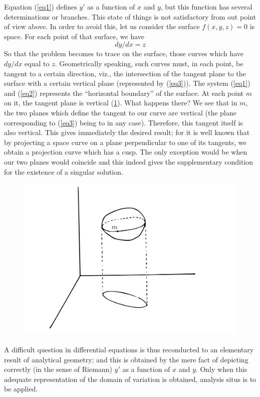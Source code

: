 \documentclass[12pt,oneside]{book}
\begin{document}
Equation (\ref{eq1}) defines $y'$ as a function of $x$ and $y$, but this
function has several determinations or branches. This state of things is not
satisfactory from out point of view above. In order to avoid this, let us
consider the surface $f(x,y,z)=0$ is space. For each point of that surface, we
have
\begin{equation}
    dy/dx=z
    \label{eq3}
\end{equation}
So that the problem becomes to trace on the surface, those curves which have
$dy/dx$ equal to $z$. Geometrically speaking, such curves must, in each point,
be tangent to a certain direction, viz., the intersection of the tangent plane
to the surface with a certain vertical plane (represented by (\ref{eq3})). The
system (\ref{eq1}) and (\ref{eq2}) represents the ``horizontal boundary'' of the
surface. At each point $m$ on it, the tangent plane is vertical (\ref{Fig6}).
What happens there? We see that in $m$, the two planes which define the tangent
to our curve are vertical (the plane corresponding to (\ref{eq3}) being to in
any case). Therefore, this tangent itself is also vertical. This gives
immediately the desired result; for it is well known that by projecting a space
curve on a plane perpendicular to one of its tangents, we obtain a projection
curve which has a cusp. The only exception would be when our two planes would
coincide and this indeed gives the supplementary condition for the existence of
a singular solution. \par

\begin{figure}
    \centering
    \includegraphics[height=8cm]{Fig6.jpeg}
    \label{Fig6}
\end{figure}

A difficult question in differential equations is thus reconducted to an
elementary result of analytical geometry; and this is obtained by the mere fact
of depicting correctly (in the sense of Riemann) $y'$ as a function of $x$ and
$y$. Only when this adequate representation of the domain of variation is
obtained, analysis situs is to be applied. \par
\end{document}
